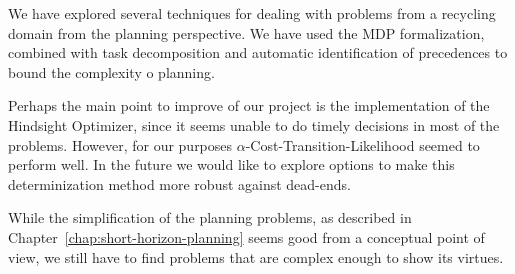 \documentclass[../root.tex]{subfiles}
\begin{document}
We have explored several techniques for dealing with problems from a recycling domain
from the planning perspective.
We have used the MDP formalization, combined with task decomposition and automatic identification
of precedences to bound the complexity o planning.

Perhaps the main point to improve of our project is the implementation of the Hindsight
Optimizer, since it seems unable to do timely decisions in most of the problems. However,
for our purposes $\alpha$-Cost-Transition-Likelihood seemed to perform well. In the future
we would like to explore options to make this determinization method more robust against
dead-ends.

While the simplification of the planning problems, as described in Chapter~\ref{chap:short-horizon-planning} seems good from a conceptual point of view, we still
have to find problems that are complex enough to show its virtues.

\end{document}
